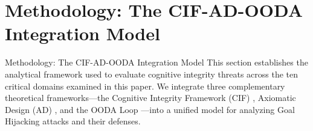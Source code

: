 \documentclass[
  ignorenonframetext,
]{beamer}
\author{\texorpdfstring{}{}}
\date{}
\begin{document}
\section{Methodology: The CIF-AD-OODA Integration
Model}\label{sec:methodology}

\begin{frame}[allowframebreaks]{Methodology: The CIF-AD-OODA Integration
Model}
This section establishes the analytical framework used to evaluate
cognitive integrity threats across the ten critical domains examined in
this paper. We integrate three complementary theoretical
frameworks---the Cognitive Integrity Framework (CIF)
\cite{friedman2026cogsec1}, Axiomatic Design (AD)
\cite{suh1990principles, suh2001axiomatic}, and the OODA Loop
\cite{boyd1987patterns}---into a unified model for analyzing Goal
Hijacking attacks and their defenses.
\end{frame}
\end{document}
